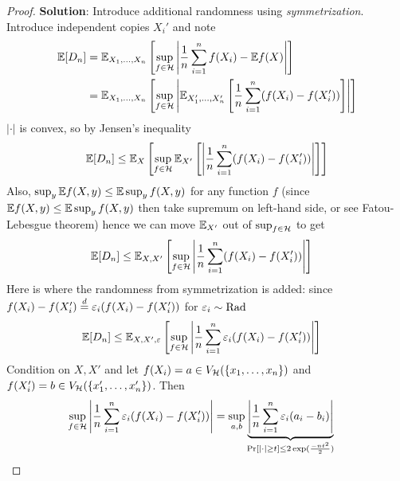 \begin{proof}
    \textbf{Solution}: Introduce additional randomness using \emph{symmetrization}.
    Introduce independent copies $X_i'$ and note
    \begin{align}
        \mathbb{E}[D_n] &= \mathbb{E}_{X_1, \ldots, X_n}\left[\sup_{f \in \mathcal{H}} \left\lvert
            \frac{1}{n} \sum_{i=1}^n f(X_i) - \mathbb{E} f(X)
        \right\rvert \right] \\
        &= \mathbb{E}_{X_1, \ldots, X_n} \left[ \sup_{f \in \mathcal{H}} \left\lvert \mathbb{E}_{X_1', \ldots, X_n'} \left[
            \frac{1}{n} \sum_{i=1}^n (f(X_i) - f(X_i'))
        \right]\right\rvert\right]
    \end{align}
    $\lvert \cdot \rvert$ is convex, so by Jensen's inequality
    \begin{align}
        \mathbb{E}[D_n]
        \leq \mathbb{E}_{X} \left[ \sup_{f \in \mathcal{H}} \mathbb{E}_{X'} \left[\left\lvert 
            \frac{1}{n} \sum_{i=1}^n (f(X_i) - f(X_i'))
        \right\rvert \right]\right]
    \end{align}
    Also, $\sup_y \mathbb{E} f(X,y) \leq \mathbb{E} \sup_y f(X,y)$ for any function $f$ 
    (since $\mathbb{E} f(X,y) \leq \mathbb{E} \sup_y f(X,y)$ then take supremum on left-hand side, or see Fatou-Lebesgue theorem)
    hence we can move $\mathbb{E}_{X'}$ out of $\sup_{f \in \mathcal{H}}$ to get
    \begin{align}
        \mathbb{E}[D_n]
        &\leq \mathbb{E}_{X, X'}\left[
        \sup_{f \in \mathcal{H}} \left\lvert \frac{1}{n} \sum_{i=1}^n ( f(X_i) - f(X_i') ) 
        \right\rvert\right]
    \end{align}
    Here is where the randomness from symmetrization is added:
    since $f(X_i) - f(X_i') \overset{d}{=} \varepsilon_i(f(X_i) - f(X_i'))$ for $\varepsilon_i \sim \text{Rad}$
    \begin{align}
        \mathbb{E}[D_n]
        &\leq \mathbb{E}_{X, X', \varepsilon}\left[
        \sup_{f \in \mathcal{H}} \left\lvert \frac{1}{n} \sum_{i=1}^n \varepsilon_i ( f(X_i) - f(X_i') ) 
        \right\rvert\right] \label{eq:9-10-symmetrized-need-concentration}
    \end{align}
    Condition on $X, X'$ and let $f(X_i) = a \in V_{\mathcal{H}}(\{x_1, \ldots, x_n\})$
    and $f(X_i') = b \in V_{\mathcal{H}}(\{x_1', \ldots, x_n'\})$. Then
    \begin{align}
        \sup_{f \in \mathcal{H}}
            \left\lvert \frac{1}{n} \sum_{i=1}^n \varepsilon_i(f(X_i) - f(X_i')) \right\rvert
        &= \sup_{a, b} 
            \underbrace{
                \left\lvert \frac{1}{n} \sum_{i=1}^n \varepsilon_i (a_i - b_i)\right\rvert
            }_{\Pr[\lvert \cdot \rvert \geq t] \leq 2 \exp(\frac{-n t^2}{2})}
    \end{align}

\end{proof}
